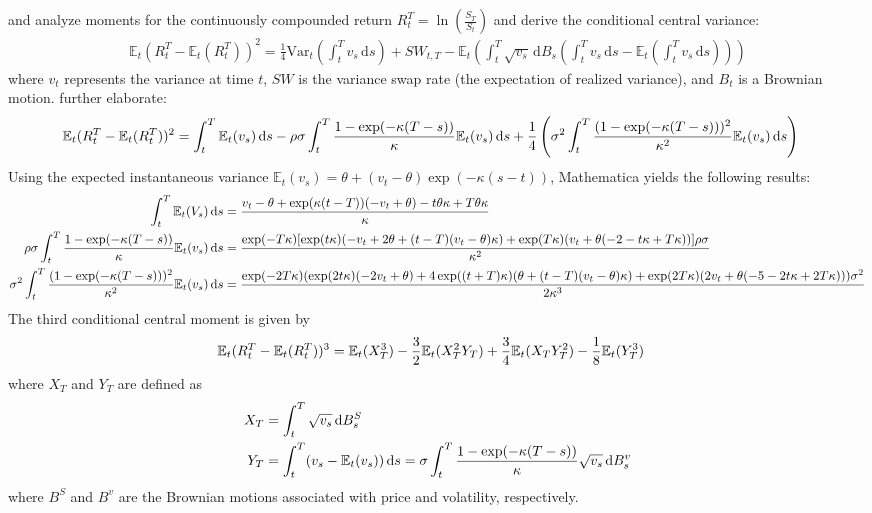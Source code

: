 \cite{zhaoRelationPhysicalRiskneutral2013} and \cite{zhangSkewnessImpliedHeston2017} analyze moments for the continuously compounded return $R_t^T = \ln\left(\frac{S_T}{S_t}\right)$ and derive the conditional central variance:
\begin{align}
    \mathbb{E}_t(R_t^T-\mathbb{E}_t(R_t^T))^2 = \frac{1}{4}\text{Var}_t(\int_t ^T v_s\,\mathrm{d}s) + SW_{t,T} - \mathbb{E}_t(\int_t^T \sqrt{v_s}\,\mathrm{d}B_s(\int_t^T v_s\,\mathrm{d}s-\mathbb{E}_t(\int_t^T v_s\,\mathrm{d}s)))
\end{align}
where $v_t$ represents the variance at time $t$, $SW$ is the variance swap rate (the expectation of realized variance), and $B_t$ is a Brownian motion. \cite{zhangSkewnessImpliedHeston2017} further elaborate:
\begin{align}
    \mathbb{E}_t(R_t^T-\mathbb{E}_t(R_t^T))^2 &= \int_t^T \mathbb{E}_t(v_s)\,\mathrm{d}s - \rho\sigma\int_t^T \frac{1-\exp(-\kappa(T-s))}{\kappa}\mathbb{E}_t(v_s)\,\mathrm{d}s + \frac{1}{4}\left(\sigma^2\int_t^T\frac{(1-\exp(-\kappa(T-s)))^2}{\kappa^2}\mathbb{E}_t(v_s) \,\mathrm{d}s\right) \notag
\end{align}
Using the expected instantaneous variance $\mathbb{E}_t(v_s) = \theta + (v_t - \theta)\exp(-\kappa(s-t))$, Mathematica yields the following results:
\begin{align}
    \int_t^T\mathbb{E}_t(V_s)\,\mathrm{d}s &= \frac{v_t - \theta + \exp(\kappa(t-T))(-v_t+\theta) - t \theta\kappa + T\theta\kappa}{\kappa} \notag \\
    \rho\sigma\int_t^T \frac{1-\exp(-\kappa(T-s))}{\kappa}\mathbb{E}_t(v_s)\,\mathrm{d}s &= \frac{\exp(-T\kappa)[\exp(t\kappa)(-v_t+2\theta+(t-T)(v_t-\theta)\kappa) + \exp(T\kappa)(v_t+\theta(-2-t\kappa + T\kappa))]\rho\sigma}{\kappa^2} \notag \\
    \sigma^2\int_t^T\frac{(1-\exp(-\kappa(T-s)))^2}{\kappa^2}\mathbb{E}_t(v_s) \,\mathrm{d}s &= \frac{\exp(-2T\kappa)(\exp(2t\kappa)(-2v_t+\theta) + 4\exp((t+T)\kappa)(\theta + (t-T)(v_t-\theta)\kappa) + \exp(2T\kappa)(2v_t + \theta(-5-2t\kappa + 2T\kappa)))\sigma^2}{2\kappa^3} \notag
\end{align}
The third conditional central moment is given by
\begin{align}
    \mathbb{E}_t(R_t^T-\mathbb{E}_t(R_t^T))^3 &= \mathbb{E}_t(X_T^3) - \frac{3}{2}\mathbb{E}_t(X_T^2Y_T) + \frac{3}{4}\mathbb{E}_t(X_TY_T^2) - \frac{1}{8}\mathbb{E}_t(Y_T^3) \notag
\end{align}
where $X_T$ and $Y_T$ are defined as
\begin{align}
    X_T &= \int_t^T \sqrt{v_s}\,\mathrm{d}B_s^S \notag \\
    Y_T &= \int_t^T (v_s - \mathbb{E}_t(v_s))\,\mathrm{d}s = \sigma\int_t^T\frac{1-\exp(-\kappa(T-s))}{\kappa}\sqrt{v_s}\,\mathrm{d}B_s^v \notag
\end{align}
where $B^S$ and $B^v$ are the Brownian motions associated with price and volatility, respectively.

